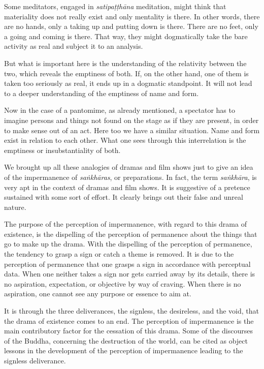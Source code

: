 Some meditators, engaged in \emph{satipaṭṭhāna} meditation, might think that materiality does not really exist and only mentality is there. In other words, there are no hands, only a taking up and putting down is there. There are no feet, only a going and coming is there. That way, they might dogmatically take the bare activity as real and subject it to an analysis.

But what is important here is the understanding of the relativity between the two, which reveals the emptiness of both. If, on the other hand, one of them is taken too seriously as real, it ends up in a dogmatic standpoint. It will not lead to a deeper understanding of the emptiness of name and form.

Now in the case of a pantomime, as already mentioned, a spectator has to imagine persons and things not found on the stage as if they are present, in order to make sense out of an act. Here too we have a similar situation. Name and form exist in relation to each other. What one sees through this interrelation is the emptiness or insubstantiality of both.

We brought up all these analogies of dramas and film shows just to give an idea of the impermanence of \emph{saṅkhāras}, or preparations. In fact, the term \emph{saṅkhāra}, is very apt in the context of dramas and film shows. It is suggestive of a pretence sustained with some sort of effort. It clearly brings out their false and unreal nature.

The purpose of the perception of impermanence, with regard to this drama of existence, is the dispelling of the perception of permanence about the things that go to make up the drama. With the dispelling of the perception of permanence, the tendency to grasp a sign or catch a theme is removed. It is due to the perception of permanence that one grasps a sign in accordance with perceptual data. When one neither takes a sign nor gets carried away by its details, there is no aspiration, expectation, or objective by way of craving. When there is no aspiration, one cannot see any purpose or essence to aim at.

It is through the three deliverances, the signless, the desireless, and the void, that the drama of existence comes to an end. The perception of impermanence is the main contributory factor for the cessation of this drama. Some of the discourses of the Buddha, concerning the destruction of the world, can be cited as object lessons in the development of the perception of impermanence leading to the signless deliverance.

